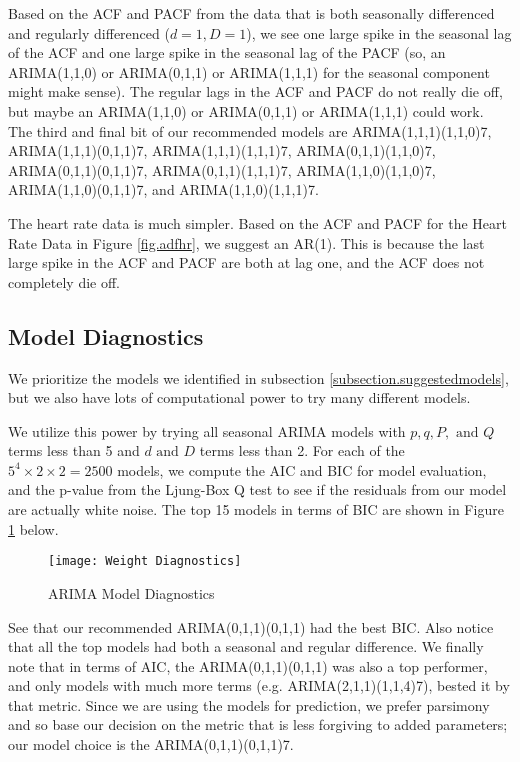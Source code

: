\documentclass[12pt, letterpaper]{article}
\theoremstyle{definition}
\numberwithin{equation}{section}
\newcommand{\+}[1]{+_{\scalebox{.375}{#1}}}
\newcommand{\1}{\mathbbm{1}}
\begin{document}
Based on the ACF and PACF from the data that is both seasonally differenced and regularly differenced ($d=1, D=1$), we see one large spike in the seasonal lag of the ACF and one large spike in the seasonal lag of the PACF (so, an ARIMA(1,1,0) or ARIMA(0,1,1) or ARIMA(1,1,1) for the seasonal component might make sense). The regular lags in the ACF and PACF do not really die off, but maybe an ARIMA(1,1,0) or ARIMA(0,1,1) or ARIMA(1,1,1) could work. The third and final bit of our recommended models are 
ARIMA(1,1,1)(1,1,0)7, ARIMA(1,1,1)(0,1,1)7, ARIMA(1,1,1)(1,1,1)7, ARIMA(0,1,1)(1,1,0)7, ARIMA(0,1,1)(0,1,1)7, ARIMA(0,1,1)(1,1,1)7,
ARIMA(1,1,0)(1,1,0)7, ARIMA(1,1,0)(0,1,1)7, and ARIMA(1,1,0)(1,1,1)7.
\vspace{\baselineskip}


The heart rate data is much simpler. Based on the ACF and PACF for the Heart Rate Data in Figure \ref{fig.adfhr}, we suggest an AR(1). This is because the last large spike in the ACF and PACF are both at lag one, and the ACF does not completely die off.
\vspace{\baselineskip}


\newpage
\subsection{Model Diagnostics}
\label{subsection.diagnostics}

We prioritize the models we identified in subsection \ref{subsection.suggestedmodels}, but we also have lots of computational power to try many different models.
\vspace{\baselineskip}

We utilize this power by trying all seasonal ARIMA models with $p, q, P, \text{ and } Q$ terms less than 5 and $d \text{ and } D$ terms less than 2. For each of the $5^4\times2\times 2=2500$ models, we compute the AIC and BIC for model evaluation, and the p-value from the Ljung-Box Q test to see if the residuals from our model are actually white noise. The top 15 models in terms of BIC are shown in Figure \ref{Model Fit} below. 

\begin{figure}[H]
	\centering
	\texttt{[image: Weight Diagnostics]}
	\caption{ARIMA Model Diagnostics}
	\label{Model Fit}
\end{figure}

See that our recommended ARIMA(0,1,1)(0,1,1) had the best BIC. Also notice that all the top models had both a seasonal and regular difference. We finally note that in terms of AIC, the ARIMA(0,1,1)(0,1,1) was also a top performer, and only models with much more terms (e.g. ARIMA(2,1,1)(1,1,4)7), bested it by that metric. Since we are using the models for prediction, we prefer parsimony and so base our decision on the metric that is less forgiving to added parameters; our model choice is the ARIMA(0,1,1)(0,1,1)7.
\vspace{\baselineskip}
\end{document}
